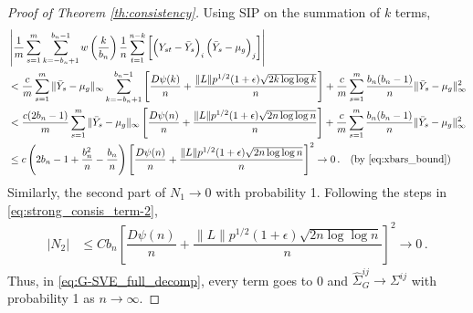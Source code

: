 \documentclass[12pt]{article}
\theoremstyle{remark}
\begin{document}
\begin{proof}[Proof of Theorem \ref{th:consistency}]
Using SIP on the summation of $k$ terms,
\begin{align*}
    & \left|\dfrac{1}{m}\sum_{s=1}^{m}\sum_{k=-b_n+1}^{b_n-1}w\left(\dfrac{k}{b_n}\right)\dfrac{1}{n}\sum_{t=1}^{n-k}\left[ \left(Y_{st} - \bar{Y}_s \right)_i  \left(\bar{Y}_s - \mu_g \right)_j \right] \right|\\
   &  < \dfrac{c}{m}\sum\limits_{s=1}^{m}\|\bar{Y}_s - \mu_g\|_{\infty}\sum\limits_{k=-b_n + 1}^{b_n-1}\left[ \dfrac{D \psi(k)}{n} + \dfrac{\|L\| p^{1/2}(1+\epsilon)\sqrt{2k \log\log k}}{n}  \right] + \dfrac{c}{m}\sum\limits_{s=1}^{m} \dfrac{b_n(b_n-1)}{n}\|\bar{Y}_s - \mu_g\|_{\infty}^2\\
   &  < \dfrac{c(2b_n-1)}{m}\sum\limits_{s=1}^{m}\|\bar{Y}_s - \mu_g\|_{\infty}\left[ \dfrac{D \psi(n)}{n} + \dfrac{\|L\| p^{1/2}(1+\epsilon)\sqrt{2n \log\log n}}{n}  \right] + \dfrac{c}{m}\sum\limits_{s=1}^{m} \dfrac{b_n(b_n-1)}{n}\|\bar{Y}_s - \mu_g\|_{\infty}^2 \\
   &  \leq   c\left(2b_n - 1 + \dfrac{b_n^2}{n} - \dfrac{b_n}{n}\right)\left[ \dfrac{D \psi(n)}{n} + \dfrac{\|L\| p^{1/2}(1+\epsilon)\sqrt{2n \log\log n}}{n}  \right]^2  \to 0\,. \quad  \text{(by \eqref{eq:xbars_bound})}
\end{align*}
%
% 
%
%
Similarly, the second part of $N_1 \to 0$ with probability 1. 
%
Following the steps in \eqref{eq:strong_consis_term-2}, 
\begin{align*}
    |N_2| & \leq Cb_n\left[ \dfrac{D \psi(n)}{n} + \dfrac{\|L\| p^{1/2}(1+\epsilon)\sqrt{2n \log\log n}}{n}  \right]^2  \to 0\,.
\end{align*}
Thus, in \eqref{eq:G-SVE_full_decomp}, every term goes to 0 and $\hat{\Sigma}_{G}^{ij} \to \Sigma^{ij}$ with probability 1 as $n \to \infty$. 
\end{proof}
\end{document}
